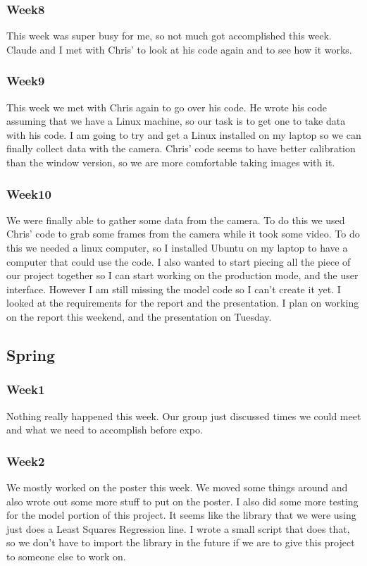 	\subsubsection*{Week8}
		This week was super busy for me, so not much got accomplished this week. Claude and I met with Chris' to look at his code again and to see how it works.
	\subsubsection*{Week9}
		This week we met with Chris again to go over his code. He wrote his code assuming that we have a Linux machine, so our task is to get one to take data with his code. I am going to try and get a Linux installed on my laptop so we can finally collect data with the camera. Chris' code seems to have better calibration than the window version, so we are more comfortable taking images with it.
	\subsubsection*{Week10}
		We were finally able to gather some data from the camera. To do this we used Chris' code to grab some frames from the camera while it took some video. To do this we needed a linux computer, so I installed Ubuntu on my laptop to have a computer that could use the code. I also wanted to start piecing all the piece of our project together so I can start working on the production mode, and the user interface. However I am still missing the model code so I can't create it yet. I looked at the requirements for the report and the presentation. I plan on working on the report this weekend, and the presentation on Tuesday.
\subsection*{Spring}
	\subsubsection*{Week1}
		Nothing really happened this week. Our group just discussed times we could meet and what we need to accomplish before expo.
	\subsubsection*{Week2}
		We mostly worked on the poster this week. We moved some things around and also wrote out some more stuff to put on the poster. I also did some more testing for the model portion of this project. It seems like the library that we were using just does a Least Squares Regression line. I wrote a small script that does that, so we don't have to import the library in the future if we are to give this project to someone else to work on.

